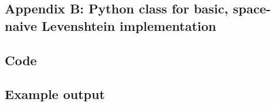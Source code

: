 \documentclass[a4paper,11pt,twoside,notitlepage]{article}
\begin{document}
\begin{appendices}
\clearpage
\section{Appendix B: Python class for basic, space-naive Levenshtein
  implementation}
\subsection{Code}

\subsection{Example output}
\end{appendices}
\end{document}
